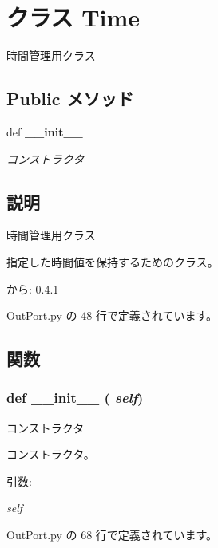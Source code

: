 \section{クラス Time}
\label{classsource__py_1_1_out_port_1_1_time}
時間管理用クラス  


\subsection*{Public メソッド}
\begin{CompactItemize}
\item 
def {\bf \_\-\_\-init\_\-\_\-}
\begin{CompactList}\small\item\em コンストラクタ \item\end{CompactList}\end{CompactItemize}


\subsection{説明}
時間管理用クラス 

指定した時間値を保持するためのクラス。

\begin{Desc}
\item[から:]0.4.1 \end{Desc}


 OutPort.py の 48 行で定義されています。

\subsection{関数}
\subsubsection{\setlength{\rightskip}{0pt plus 5cm}def \_\-\_\-init\_\-\_\- ( {\em self})}\label{classsource__py_1_1_out_port_1_1_time_c775ee34451fdfa742b318538164070e}


コンストラクタ 

コンストラクタ。

\begin{Desc}
\item[引数:]
\begin{description}
\item[{\em self}]\end{description}
\end{Desc}


 OutPort.py の 68 行で定義されています。